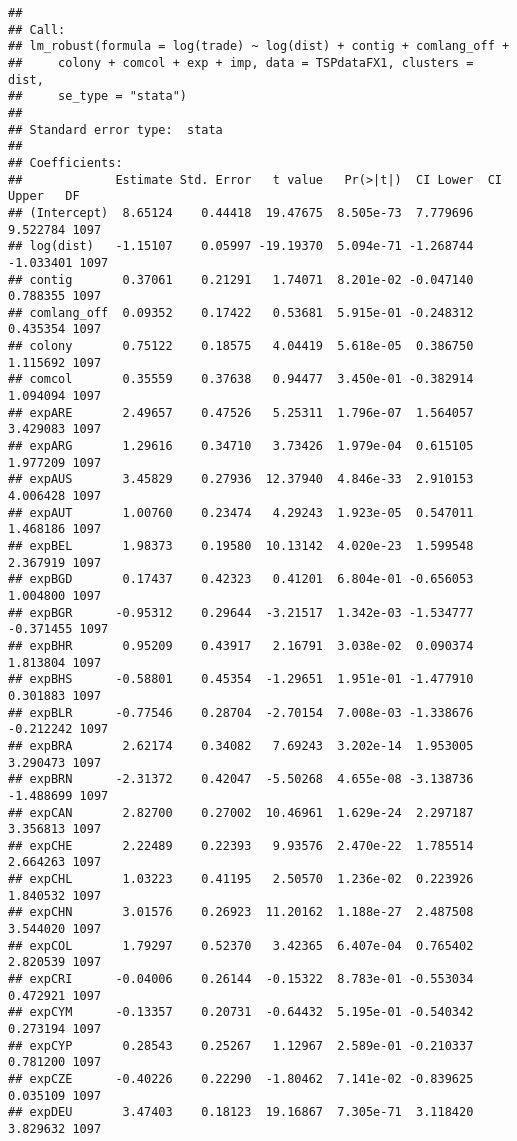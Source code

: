 \documentclass[
]{article}
\begin{document}
\begin{verbatim}
## 
## Call:
## lm_robust(formula = log(trade) ~ log(dist) + contig + comlang_off + 
##     colony + comcol + exp + imp, data = TSPdataFX1, clusters = dist, 
##     se_type = "stata")
## 
## Standard error type:  stata 
## 
## Coefficients:
##             Estimate Std. Error   t value   Pr(>|t|)  CI Lower  CI Upper   DF
## (Intercept)  8.65124    0.44418  19.47675  8.505e-73  7.779696  9.522784 1097
## log(dist)   -1.15107    0.05997 -19.19370  5.094e-71 -1.268744 -1.033401 1097
## contig       0.37061    0.21291   1.74071  8.201e-02 -0.047140  0.788355 1097
## comlang_off  0.09352    0.17422   0.53681  5.915e-01 -0.248312  0.435354 1097
## colony       0.75122    0.18575   4.04419  5.618e-05  0.386750  1.115692 1097
## comcol       0.35559    0.37638   0.94477  3.450e-01 -0.382914  1.094094 1097
## expARE       2.49657    0.47526   5.25311  1.796e-07  1.564057  3.429083 1097
## expARG       1.29616    0.34710   3.73426  1.979e-04  0.615105  1.977209 1097
## expAUS       3.45829    0.27936  12.37940  4.846e-33  2.910153  4.006428 1097
## expAUT       1.00760    0.23474   4.29243  1.923e-05  0.547011  1.468186 1097
## expBEL       1.98373    0.19580  10.13142  4.020e-23  1.599548  2.367919 1097
## expBGD       0.17437    0.42323   0.41201  6.804e-01 -0.656053  1.004800 1097
## expBGR      -0.95312    0.29644  -3.21517  1.342e-03 -1.534777 -0.371455 1097
## expBHR       0.95209    0.43917   2.16791  3.038e-02  0.090374  1.813804 1097
## expBHS      -0.58801    0.45354  -1.29651  1.951e-01 -1.477910  0.301883 1097
## expBLR      -0.77546    0.28704  -2.70154  7.008e-03 -1.338676 -0.212242 1097
## expBRA       2.62174    0.34082   7.69243  3.202e-14  1.953005  3.290473 1097
## expBRN      -2.31372    0.42047  -5.50268  4.655e-08 -3.138736 -1.488699 1097
## expCAN       2.82700    0.27002  10.46961  1.629e-24  2.297187  3.356813 1097
## expCHE       2.22489    0.22393   9.93576  2.470e-22  1.785514  2.664263 1097
## expCHL       1.03223    0.41195   2.50570  1.236e-02  0.223926  1.840532 1097
## expCHN       3.01576    0.26923  11.20162  1.188e-27  2.487508  3.544020 1097
## expCOL       1.79297    0.52370   3.42365  6.407e-04  0.765402  2.820539 1097
## expCRI      -0.04006    0.26144  -0.15322  8.783e-01 -0.553034  0.472921 1097
## expCYM      -0.13357    0.20731  -0.64432  5.195e-01 -0.540342  0.273194 1097
## expCYP       0.28543    0.25267   1.12967  2.589e-01 -0.210337  0.781200 1097
## expCZE      -0.40226    0.22290  -1.80462  7.141e-02 -0.839625  0.035109 1097
## expDEU       3.47403    0.18123  19.16867  7.305e-71  3.118420  3.829632 1097

\end{verbatim}
\end{document}
